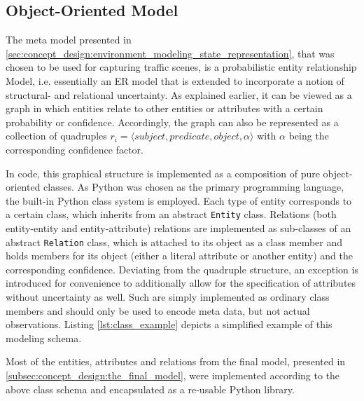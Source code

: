 \subsection{Object-Oriented Model}
\label{subsec:implementation:object_oriented_model}
The meta model presented in \cref{sec:concept_design:environment_modeling_state_representation}, that was chosen to be used for capturing traffic scenes, is a probabilistic entity relationship Model, i.e. essentially an ER model that is extended to incorporate a notion of structural- and relational uncertainty. As explained earlier, it can be viewed as a graph in which entities relate to other entities or attributes with a certain probability or confidence. Accordingly, the graph can also be represented as a collection of quadruples $r_i = \langle \textit{subject}, \textit{predicate}, \textit{object}, \alpha \rangle$ with $\alpha$ being the corresponding confidence factor. 

In code, this graphical structure is implemented as a composition of pure object-oriented classes. As Python was chosen as the primary programming language, the built-in Python class system is employed. Each type of entity corresponds to a certain class, which inherits from an abstract \texttt{Entity} class. Relations (both entity-entity and entity-attribute) relations are implemented as sub-classes of an abstract \texttt{Relation} class, which is attached to its object as a class member and holds members for its object (either a literal attribute or another entity) and the corresponding confidence. Deviating from the quadruple structure, an exception is introduced for convenience to additionally allow for the specification of attributes without uncertainty as well. Such are simply implemented as ordinary class members and should only be used to encode meta data, but not actual observations. Listing \ref{lst:class_example} depicts a simplified example of this modeling schema.

Most of the entities, attributes and relations from the final model, presented in \cref{subsec:concept_design:the_final_model}, were implemented according to the above class schema and encapsulated as a re-usable Python library.

\begin{samepage}
\inputminted[fontsize=\footnotesize]{python}{97_listings/class_example.py}
\label{lst:class_example}
\end{samepage}

